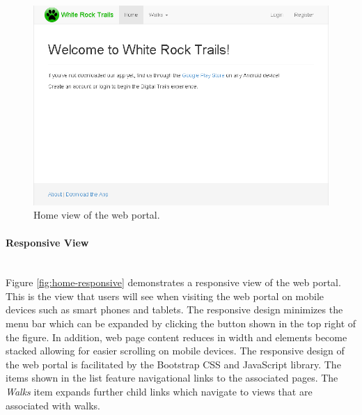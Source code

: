 \documentclass[11pt,a4paper]{report}
\begin{document}
\begin{figure}[H]

\centering

\includegraphics[width=1\linewidth]{./img/webportal/home}

\caption{Home view of the web portal.}

\label{fig:home}

\end{figure}



\paragraph{Responsive View}\mbox{}\\
Figure \ref{fig:home-responsive} demonstrates a responsive view of the web portal. This is the view that users will see when visiting the web portal on mobile devices such as smart phones and tablets. The responsive design minimizes the menu bar which can be expanded by clicking the button shown in the top right of the figure. In addition, web page content reduces in width and elements become stacked allowing for easier scrolling on mobile devices. The responsive design of the web portal is facilitated by the Bootstrap CSS and JavaScript library\cite{milestone2}. The items shown in the list feature navigational links to the associated pages. The \emph{Walks} item expands further child links which navigate to views that are associated with walks.
\end{document}
